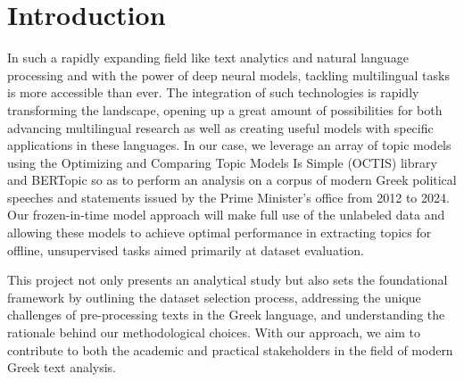 \section{Introduction}
\label{sec:Introduction}
In such a rapidly expanding field like text analytics and natural language processing and with the power of deep neural models, tackling multilingual tasks is more accessible than ever. The integration of such technologies is rapidly transforming the landscape, opening up a great amount of possibilities for both advancing multilingual research as well as creating useful models with specific applications in these languages. In our case, we leverage an array of topic models using the Optimizing and Comparing Topic Models Is Simple (OCTIS) \citep{Terragni;Fersini;Galuzzi;Tropeano;Candelieri;21} library and BERTopic \citep{grootendorst2022bertopic} so as to perform an analysis on a corpus of modern Greek political speeches and statements issued by the Prime Minister's office from 2012 to 2024. Our frozen-in-time model approach will make full use of the unlabeled data and allowing these models to achieve optimal performance in extracting topics for offline, unsupervised tasks aimed primarily at dataset evaluation.

This project not only presents an analytical study but also sets the foundational framework by outlining the dataset selection process, addressing the unique challenges of pre-processing texts in the Greek language, and understanding the rationale behind our methodological choices. With our approach, we aim to contribute to both the academic and practical stakeholders in the field of modern Greek text analysis.